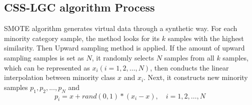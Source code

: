 \documentclass{svjour3}                     %
\begin{document}
\subsection{CSS-LGC algorithm Process}\label{subsec:css-lgc-pro}
 SMOTE algorithm generates virtual data through a synthetic way. For each minority category sample, the method looks for its $k$ samples with the highest similarity. Then Upward sampling method is applied. If the amount of upward sampling samples is set as $N$, it randomly selects $N$ samples from all $k$ samples, which can be represented as ${x_i}\left( {i = 1,2, \ldots ,N} \right)$, then conducts the linear interpolation between minority class $x$ and $x_i$. Next, it constructs new minority samples ${p_1},{p_2},...,{p_N}$ and 
 \begin{equation}\label{formula:init}
  {p_i} = x + rand(0,1)*({x_i} - x), \quad i = 1,2,\ldots,N
 \end{equation}
\end{document}
